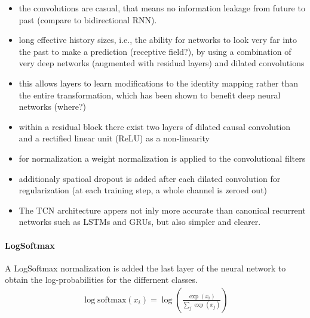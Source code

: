 \documentclass{scrartcl}
\begin{document}
\begin{itemize}
\item the convolutions are casual, that means no information leakage from future to past (compare to bidirectional RNN).
\item long effective history sizes, i.e., the ability for networks to look very far into the past to make a prediction (receptive field?), by using a combination of very deep networks (augmented with residual layers) and dilated convolutions 
\item this allows layers to learn modifications to the identity mapping rather than the entire transformation, which has been shown to benefit deep neural networks (where?)
\item within a residual block there exist two layers of dilated causal convolution and a rectified linear unit (ReLU) \cite[Nair2010]{Nair2010} as a non-linearity
\item for normalization a weight normalization \cite[Salimans2016]{Salimans2016} is applied to the convolutional filters 
\item additionaly spatioal dropout \cite[Srivastava2014]{Srivastava2014} is added after each dilated convolution for regularization (at each training step, a whole channel is zeroed out)
\item The TCN architecture appers not inly more accurate than canonical recurrent networks such as LSTMs and GRUs, but also simpler and clearer.
\end{itemize}

\paragraph{LogSoftmax}

A LogSoftmax normalization is added the last layer of the neural network to obtain the log-probabilities for the differnent classes.
\begin{align}
\log \text{softmax}(x_i) = \log\left(\frac{\exp{(x_i)}}{\sum_j \exp(x_j)}\right)
\end{align} 


\end{document}
